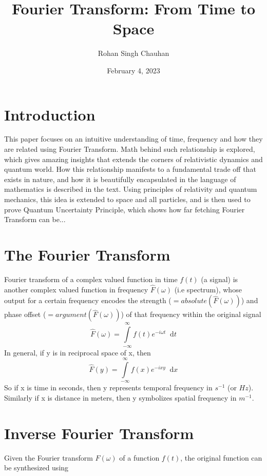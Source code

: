 \documentclass[11pt, a4paper]{article}
\title{Fourier Transform: From Time to Space}
\author{Rohan Singh Chauhan}
\date{February 4, 2023}
\let\oldsection\section
\renewcommand{\section}{%
	\setcounter{equation}{0}%
	\oldsection%
}
\newcommand{\diff}{\mathop{}\!\mathrm{d}}
\newcommand{\dx}{\diff x}
\newcommand{\dt}{\diff t}
\newcommand{\dint}[2]{\int \limits_{#1}^{#2}}  %
\newcommand{\intinfty}{\dint{-\infty}{\infty}}	%
\begin{document}
\maketitle

\section{Introduction}\label{sec:intro}
This paper focuses on an intuitive understanding of time, frequency and how they are related using Fourier Transform. Math behind such relationship is explored, which gives amazing insights that extends the corners of relativistic dynamics and quantum world. How this relationship manifests to a fundamental trade off that exists in nature, and how it is beautifully encapsulated in the language of mathematics is described in the text. Using principles of relativity and quantum mechanics, this idea is extended to space and all particles, and is then used to prove Quantum Uncertainty Principle, which shows how far fetching Fourier Transform can be...

\section{The Fourier Transform}\label{sec:fourier_transform}
Fourier transform of a complex valued function in time $f(t)$ (a signal) is another complex valued function in frequency $\hat{F}(\omega)$ (i.e spectrum), whose output for a certain frequency encodes the strength ($=absolute(\hat{F}(\omega))$) and phase offset ($=argument(\hat{F}(\omega))$) of that frequency within the original signal \cite{herman2016fourieranalysis}
\begin{equation}\label{eq:ft_def}
	\boxed{
		\hat{F}(\omega) = \intinfty f(t)e^{-i\omega t} \dt
	}
\end{equation}
In general, if y is in reciprocal space of x, then
\begin{equation*}\label{eq:ft_def_general}
	\hat{F}(y) = \intinfty f(x)e^{-ixy} \dx
\end{equation*}
So if x is time in seconds, then y represents temporal frequency in $s^{-1}$ (or $Hz$). Similarly if x is distance in meters, then y symbolizes spatial frequency in $m^{-1}$.

\section{Inverse Fourier Transform}\label{sec:inverse_fourier_transform}
Given the Fourier transform $\hat{F}(\omega)$ of a function $f(t)$, the original function can be synthesized using
\end{document}
